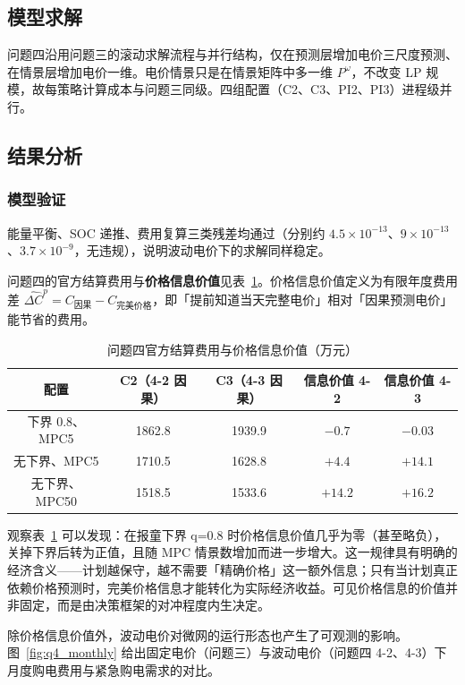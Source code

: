 \subsection{模型求解}

问题四沿用问题三的滚动求解流程与并行结构，仅在预测层增加电价三尺度预测、在情景层增加电价一维。电价情景只是在情景矩阵中多一维 $P^\omega$，不改变 LP 规模，故每策略计算成本与问题三同级。四组配置（C2、C3、PI2、PI3）进程级并行。

\subsection{结果分析}

\subsubsection{模型验证}

能量平衡、SOC 递推、费用复算三类残差均通过（分别约 $4.5\times10^{-13}$、$9\times10^{-13}$、$3.7\times10^{-9}$，无违规），说明波动电价下的求解同样稳定。

问题四的官方结算费用与\textbf{价格信息价值}见表~\ref{tab:info4}。价格信息价值定义为有限年度费用差 $\widehat{\Delta C}^p=C_{\text{因果}}-C_{\text{完美价格}}$，即「提前知道当天完整电价」相对「因果预测电价」能节省的费用。

\begin{table}[htbp]
\centering
\caption{问题四官方结算费用与价格信息价值（万元）}
\label{tab:info4}
\begin{tabular}{ccccc}
\toprule
配置 & C2（4-2 因果） & C3（4-3 因果） & 信息价值 4-2 & 信息价值 4-3 \\
\midrule
下界 0.8、MPC5 & 1862.8 & 1939.9 & $-0.7$ & $-0.03$ \\
无下界、MPC5 & 1710.5 & 1628.8 & $+4.4$ & $+14.1$ \\
无下界、MPC50 & 1518.5 & 1533.6 & $+14.2$ & $+16.2$ \\
\bottomrule
\end{tabular}
\end{table}

观察表~\ref{tab:info4} 可以发现：在报童下界 q=0.8 时价格信息价值几乎为零（甚至略负），关掉下界后转为正值，且随 MPC 情景数增加而进一步增大。这一规律具有明确的经济含义——计划越保守，越不需要「精确价格」这一额外信息；只有当计划真正依赖价格预测时，完美价格信息才能转化为实际经济收益。可见价格信息的价值并非固定，而是由决策框架的对冲程度内生决定。

除价格信息价值外，波动电价对微网的运行形态也产生了可观测的影响。图~\ref{fig:q4_monthly} 给出固定电价（问题三）与波动电价（问题四 4-2、4-3）下月度购电费用与紧急购电需求的对比。

